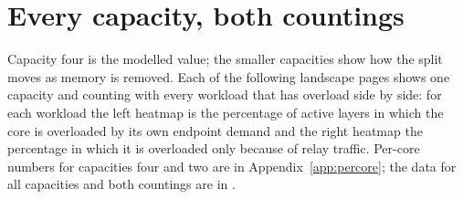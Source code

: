 \section{Every capacity, both countings}
Capacity four is the modelled value; the smaller capacities show how the split moves as memory is removed. Each of the following landscape pages shows one capacity and counting with every workload that has overload side by side: for each workload the left heatmap is the percentage of active layers in which the core is overloaded by its own endpoint demand and the right heatmap the percentage in which it is overloaded only because of relay traffic. Per-core numbers for capacities four and two are in Appendix~\ref{app:percore}; the data for all capacities and both countings are in .

